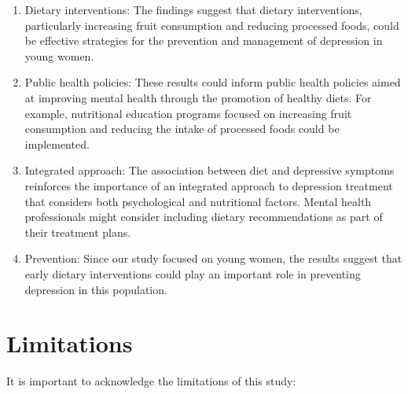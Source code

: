 \documentclass[jou]{apa7}
\begin{document}
	\begin{enumerate}
		\item Dietary interventions: The findings suggest that dietary interventions, particularly increasing fruit consumption and reducing processed foods, could be effective strategies for the prevention and management of depression in young women.
		\item Public health policies: These results could inform public health policies aimed at improving mental health through the promotion of healthy diets. For example, nutritional education programs focused on increasing fruit consumption and reducing the intake of processed foods could be implemented.
		\item Integrated approach: The association between diet and depressive symptoms reinforces the importance of an integrated approach to depression treatment that considers both psychological and nutritional factors. Mental health professionals might consider including dietary recommendations as part of their treatment plans.
		\item Prevention: Since our study focused on young women, the results suggest that early dietary interventions could play an important role in preventing depression in this population.
	\end{enumerate}

	\section{Limitations}\label{limitaciones}

	It is important to acknowledge the limitations of this study:
\end{document}
